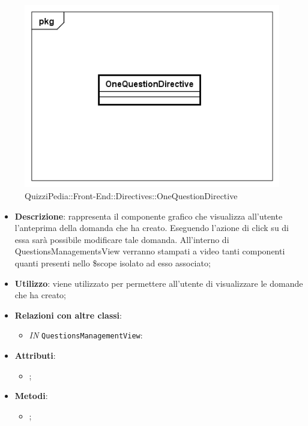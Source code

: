 \label{QuizziPedia::Front-End::Directives::OneQuestionDirective}

\begin{figure}[h]
	\centering
	\includegraphics[scale=0.5,keepaspectratio]{UML/Classi/Front-End/QuizziPedia_Front-end_Directives_OneQuestionDirective.png}
	\caption{QuizziPedia::Front-End::Directives::OneQuestionDirective}
\end{figure}

\begin{itemize}
	\item \textbf{Descrizione}: rappresenta il componente grafico che visualizza all'utente l'anteprima della domanda che ha creato. Eseguendo l'azione di click su di essa sarà possibile modificare tale domanda. All'interno di QuestionsManagementsView verranno stampati a video tanti componenti quanti presenti nello \$scope isolato ad esso associato;
	\item \textbf{Utilizzo}: viene utilizzato per permettere all'utente di visualizzare le domande che ha creato;
	\item \textbf{Relazioni con altre classi}: 
	\begin{itemize}
		\item \textit{IN} \texttt{QuestionsManagementView}: 
	\end{itemize}
	\item \textbf{Attributi}: 
	\begin{itemize}
		\item ;
	\end{itemize}
	\item \textbf{Metodi}: 
	\begin{itemize}
		\item ;
	\end{itemize}
\end{itemize}

